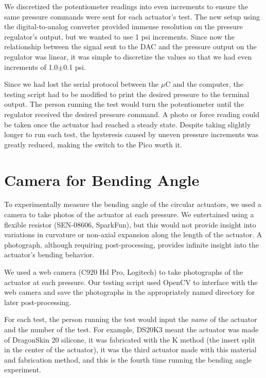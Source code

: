 We discretized the potentiometer readings into even increments to ensure the same pressure commands were sent for each actuator's test. The new setup using the digital-to-analog converter provided immense resolution on the pressure regulator's output, but we wanted to use 1 psi increments. Since now the relationship between the signal sent to the DAC and the pressure output on the regulator was linear, it was simple to discretize the values so that we had even increments of 1.0$\pm$0.1 psi. 

Since we had lost the serial protocol between the $\mu$C and the computer, the testing script had to be modified to print the desired pressure to the terminal output. The person running the test would turn the potentiometer until the regulator received the desired pressure command. A photo or force reading could be taken once the actuator had reached a steady state. Despite taking slightly longer to run each test, the hysteresis caused by uneven pressure increments was greatly reduced, making the switch to the Pico worth it. 

\section{Camera for Bending Angle}

To experimentally measure the bending angle of the circular actuators, we used a camera to take photos of the actuator at each pressure. We entertained using a flexible resistor (SEN-08606, SparkFun), but this would not provide insight into variations in curvature or non-axial expansion along the length of the actuator. A photograph, although requiring post-processing, provides infinite insight into the actuator's bending behavior. 

We used a web camera (C920 Hd Pro, Logitech) to take photographs of the actuator at each pressure. Our testing script used OpenCV \cite{opencv_library} to interface with the web camera and save the photographs in the appropriately named directory for later post-processing. 

For each test, the person running the test would input the \emph{name} of the actuator and the number of the test. For example, DS20K3 meant the actuator was made of DragonSkin 20 silicone, it was fabricated with the K method (the insert split in the center of the actuator), it was the third actuator made with this material and fabrication method, and this is the fourth time running the bending angle experiment. 

